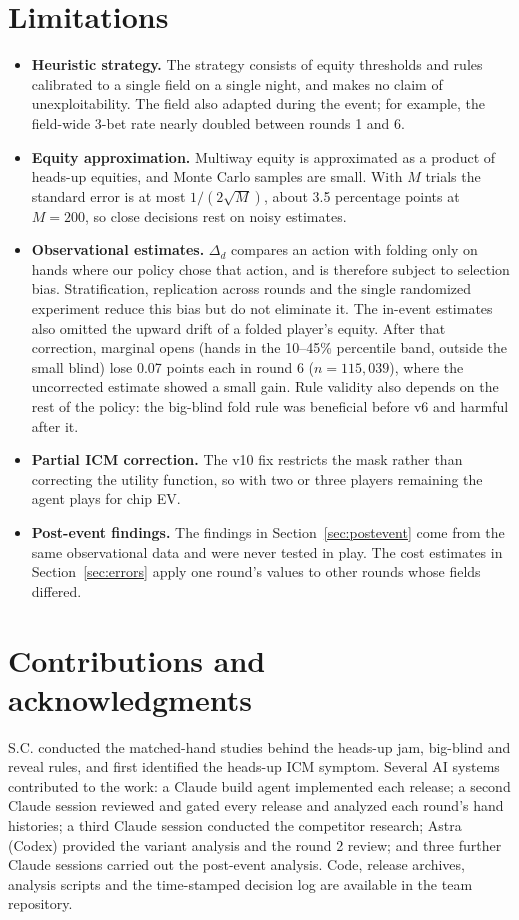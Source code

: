 \documentclass[10pt]{article}
\begin{document}
\section{Limitations}
\begin{itemize}
\item \textbf{Heuristic strategy.} The strategy consists of equity thresholds and rules calibrated to a single field on a single night, and makes no claim of unexploitability. The field also adapted during the event; for example, the field-wide 3-bet rate nearly doubled between rounds 1 and 6.
\item \textbf{Equity approximation.} Multiway equity is approximated as a product of heads-up equities, and Monte Carlo samples are small. With $M$ trials the standard error is at most $1/(2\sqrt M)$, about 3.5 percentage points at $M=200$, so close decisions rest on noisy estimates.
\item \textbf{Observational estimates.} $\Delta_d$ compares an action with folding only on hands where our policy chose that action, and is therefore subject to selection bias. Stratification, replication across rounds and the single randomized experiment reduce this bias but do not eliminate it. The in-event estimates also omitted the upward drift of a folded player's equity. After that correction, marginal opens (hands in the 10--45\% percentile band, outside the small blind) lose 0.07 points each in round 6 ($n=115{,}039$), where the uncorrected estimate showed a small gain. Rule validity also depends on the rest of the policy: the big-blind fold rule was beneficial before v6 and harmful after it.
\item \textbf{Partial ICM correction.} The v10 fix restricts the mask rather than correcting the utility function, so with two or three players remaining the agent plays for chip EV.
\item \textbf{Post-event findings.} The findings in Section~\ref{sec:postevent} come from the same observational data and were never tested in play. The cost estimates in Section~\ref{sec:errors} apply one round's values to other rounds whose fields differed.
\end{itemize}

\section*{Contributions and acknowledgments}
S.C. conducted the matched-hand studies behind the heads-up jam, big-blind and reveal rules, and first identified the heads-up ICM symptom. Several AI systems contributed to the work: a Claude build agent implemented each release; a second Claude session reviewed and gated every release and analyzed each round's hand histories; a third Claude session conducted the competitor research; Astra (Codex) provided the variant analysis and the round 2 review; and three further Claude sessions carried out the post-event analysis. Code, release archives, analysis scripts and the time-stamped decision log are available in the team repository.
\end{document}
